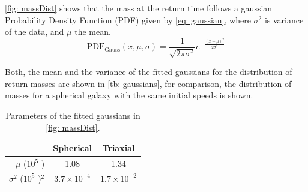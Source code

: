 	\autoref{fig: massDist} shows that the mass at the return time follows a gaussian Probability Density Function (PDF) given by \autoref{eq: gaussian}, where $\sigma^2$ is variance of the data, and $\mu$ the mean.
	\begin{equation}\label{eq: gaussian}
		\text{PDF}_\text{Gauss}(x, \mu, \sigma) = \dfrac{1}{\sqrt{2\pi\sigma^2}}e^{-\frac{(x - \mu)^2}{2\sigma^2}}
	\end{equation}
	
	Both, the mean and the variance of the fitted gaussians for the distribution of return masses are shown in \autoref{tb: gaussians}, for comparison, the distribution of masses for a spherical galaxy with the same initial speeds is shown.
	\begin{table}[h]
		\centering
		\caption{Parameters of the fitted gaussians in \autoref{fig: massDist}.}
		\begin{tabular}{r|cc}
			\hline
			& \textbf{Spherical} & \textbf{Triaxial} \\
			\hline
			$\mu$ ($10^5$ \sm)& 1.08 & 1.34 \\
			$\sigma^2$ ($10^5$ \sm)$^2$& $3.7\times10^{-4}$ & $1.7\times10^{-2}$\\
			\hline
		\end{tabular}
		\label{tb: gaussians}
	\end{table}

